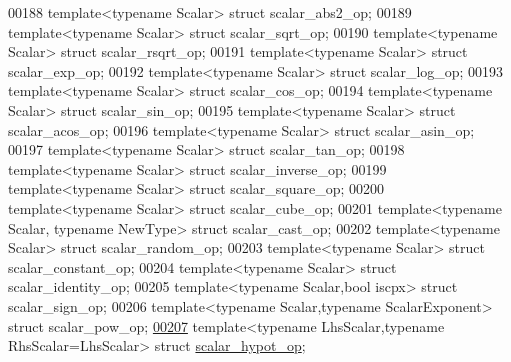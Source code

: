 \begin{DoxyCode}
00188 \textcolor{keyword}{template}<\textcolor{keyword}{typename} Scalar> \textcolor{keyword}{struct }scalar\_abs2\_op;
00189 \textcolor{keyword}{template}<\textcolor{keyword}{typename} Scalar> \textcolor{keyword}{struct }scalar\_sqrt\_op;
00190 \textcolor{keyword}{template}<\textcolor{keyword}{typename} Scalar> \textcolor{keyword}{struct }scalar\_rsqrt\_op;
00191 \textcolor{keyword}{template}<\textcolor{keyword}{typename} Scalar> \textcolor{keyword}{struct }scalar\_exp\_op;
00192 \textcolor{keyword}{template}<\textcolor{keyword}{typename} Scalar> \textcolor{keyword}{struct }scalar\_log\_op;
00193 \textcolor{keyword}{template}<\textcolor{keyword}{typename} Scalar> \textcolor{keyword}{struct }scalar\_cos\_op;
00194 \textcolor{keyword}{template}<\textcolor{keyword}{typename} Scalar> \textcolor{keyword}{struct }scalar\_sin\_op;
00195 \textcolor{keyword}{template}<\textcolor{keyword}{typename} Scalar> \textcolor{keyword}{struct }scalar\_acos\_op;
00196 \textcolor{keyword}{template}<\textcolor{keyword}{typename} Scalar> \textcolor{keyword}{struct }scalar\_asin\_op;
00197 \textcolor{keyword}{template}<\textcolor{keyword}{typename} Scalar> \textcolor{keyword}{struct }scalar\_tan\_op;
00198 \textcolor{keyword}{template}<\textcolor{keyword}{typename} Scalar> \textcolor{keyword}{struct }scalar\_inverse\_op;
00199 \textcolor{keyword}{template}<\textcolor{keyword}{typename} Scalar> \textcolor{keyword}{struct }scalar\_square\_op;
00200 \textcolor{keyword}{template}<\textcolor{keyword}{typename} Scalar> \textcolor{keyword}{struct }scalar\_cube\_op;
00201 \textcolor{keyword}{template}<\textcolor{keyword}{typename} Scalar, \textcolor{keyword}{typename} NewType> \textcolor{keyword}{struct }scalar\_cast\_op;
00202 \textcolor{keyword}{template}<\textcolor{keyword}{typename} Scalar> \textcolor{keyword}{struct }scalar\_random\_op;
00203 \textcolor{keyword}{template}<\textcolor{keyword}{typename} Scalar> \textcolor{keyword}{struct }scalar\_constant\_op;
00204 \textcolor{keyword}{template}<\textcolor{keyword}{typename} Scalar> \textcolor{keyword}{struct }scalar\_identity\_op;
00205 \textcolor{keyword}{template}<\textcolor{keyword}{typename} Scalar,\textcolor{keywordtype}{bool} iscpx> \textcolor{keyword}{struct }scalar\_sign\_op;
00206 \textcolor{keyword}{template}<\textcolor{keyword}{typename} Scalar,\textcolor{keyword}{typename} ScalarExponent> \textcolor{keyword}{struct }scalar\_pow\_op;
\hyperlink{struct_eigen_1_1internal_1_1scalar__hypot__op}{00207} \textcolor{keyword}{template}<\textcolor{keyword}{typename} LhsScalar,\textcolor{keyword}{typename} RhsScalar=LhsScalar> \textcolor{keyword}{struct }\hyperlink{struct_eigen_1_1internal_1_1scalar__hypot__op}{scalar\_hypot\_op};

\end{DoxyCode}
